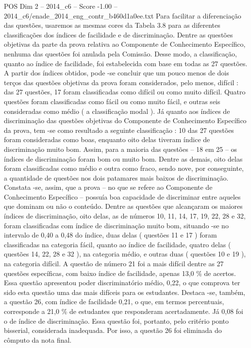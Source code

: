 \begin{textsample}{POS Dim 2 – 2014\_c6 – Score -1.00 – 2014\_c6/enade\_2014\_eng\_contr\_b460d1a0ee.txt}
Para facilitar a diferenciação das questões, usaremos as mesmas cores da Tabela 3.8 para as diferentes classificações dos índices de facilidade e de discriminação.
Dentre as questões objetivas da parte da prova relativa ao Componente de Conhecimento Específico, nenhuma das questões foi anulada pela Comissão.
Desse modo, a classificação, quanto ao índice de facilidade, foi estabelecida com base em todas as 27 questões.
A partir dos índices obtidos, pode -se concluir que um pouco menos de dois terços das questões objetivas da prova foram considerados, pelo menos, difícil : das 27 questões, 17 foram classificadas como difícil ou como muito difícil.
Quatro questões foram classificadas como fácil ou como muito fácil, e outras seis consideradas como médio ( a classificação modal ).
Já quanto aos índices de discriminação das questões objetivas do Componente de Conhecimento Específico da prova, tem -se como resultado a seguinte classificação : 10 das 27 questões foram consideradas como boas, enquanto oito delas tiveram índice de discriminação muito bom.
Assim, para a maioria das questões – 18 em 25 – os índices de discriminação foram bom ou muito bom.
Dentre as demais, oito delas foram classificadas como médio e outra como fraco, sendo nove, por conseguinte, a quantidade de questões nos dois patamares mais baixos de discriminação.
Constata -se, assim, que a prova – no que se refere ao Componente de Conhecimento Específico – possuía boa capacidade de discriminar entre aqueles que dominam ou não o conteúdo.
Dentre as questões que alcançaram os maiores índices de discriminação, oito delas, as de números 10, 11, 14, 17, 19, 22, 28 e 32, foram classificadas com índice de discriminação muito bom, situando -se no intervalo de 0,40 a 0,48 do índice, duas delas ( questões 11 e 17 ) foram classificadas na categoria fácil, quanto ao índice de facilidade, quatro delas ( questões 14, 22, 28 e 32 ), na categoria médio, e outras duas ( questões 10 e 19 ), na categoria difícil.
A questão de número 21 foi a mais difícil dentre as 27 questões específicas, com baixo índice de facilidade, apenas 13,0 \% de acertos.
Essa questão apresentou poder discriminatório médio, 0,22, o que comprova ter sido esta questão uma das mais difíceis para os estudantes.
Destaca -se, também, a questão 26, com índice de facilidade 0,21, o que, em termos percentuais, corresponde a 21,0 \% de estudantes que responderam acertadamente.
Já 0,08 foi o de índice de discriminação.
Essa questão foi, portanto, pelo critério ponto bisserial, considerada inadequada.
Por isso, a questão 26 foi eliminada do cômputo da nota final.

\end{textsample}

